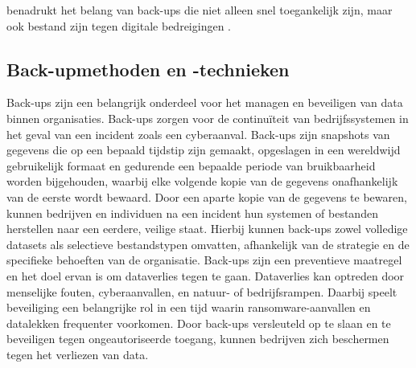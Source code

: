benadrukt het belang van back-ups die niet alleen snel toegankelijk zijn, maar ook bestand zijn tegen digitale bedreigingen \autocite{Ghazi2013}.

\subsection{Back-upmethoden en -technieken}
Back-ups zijn een belangrijk onderdeel voor het managen en beveiligen van data binnen organisaties. Back-ups zorgen voor de continuïteit van bedrijfssystemen in het geval van een incident zoals een cyberaanval. Back-ups zijn snapshots van gegevens die op een bepaald tijdstip zijn gemaakt, opgeslagen in een wereldwijd gebruikelijk formaat en gedurende een bepaalde periode van bruikbaarheid worden bijgehouden, waarbij elke volgende kopie van de gegevens onafhankelijk van de eerste wordt bewaard\autocite{Nelson2011}. Door een aparte kopie van de gegevens te bewaren, kunnen bedrijven en individuen na een incident hun systemen of bestanden herstellen naar een eerdere, veilige staat. Hierbij kunnen back-ups zowel volledige datasets als selectieve bestandstypen omvatten, afhankelijk van de strategie en de specifieke behoeften van de organisatie. Back-ups zijn een preventieve maatregel en het doel ervan is om dataverlies tegen te gaan. Dataverlies kan optreden door menselijke fouten, cyberaanvallen, en natuur- of bedrijfsrampen. Daarbij speelt beveiliging een belangrijke rol in een tijd waarin ransomware-aanvallen en datalekken frequenter voorkomen. Door back-ups versleuteld op te slaan en te beveiligen tegen ongeautoriseerde toegang, kunnen bedrijven zich beschermen tegen het verliezen van data. 
